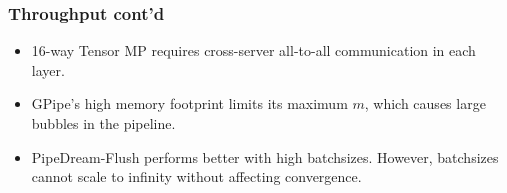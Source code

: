 \documentclass[12pt,aspectratio=169]{beamer}
\begin{document}

    \begin{frame}
        \frametitle{Throughput cont'd}

        \begin{itemize}
            \setlength{\itemsep}{.8em}
            \item 16-way Tensor MP requires cross-server all-to-all communication in each layer.
            \item GPipe's high memory footprint limits its maximum $m$, which causes large bubbles in the pipeline.
            \item PipeDream-Flush performs better with high batchsizes. However, batchsizes cannot scale to infinity
            without affecting convergence.
        \end{itemize}
    \end{frame}
\end{document}
